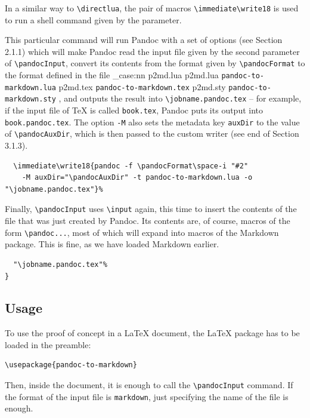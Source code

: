 \documentclass[
  digital,     %
  oneside,     %
  nosansbold,  %
  nocolorbold, %
  lof,         %
  nolot,       %
]{fithesis4}
\newcommand\macro[1]{\texttt{\textbackslash{}{#1}}}
\newcommand\file[1]
  {
    \str_case:nn
      { #1 }
      {
        { p2md.lua } { \texttt{pandoc\hyp{}to\hyp{}markdown.lua} }
        { p2md.tex } { \texttt{pandoc\hyp{}to\hyp{}markdown.tex} }
        { p2md.sty } { \texttt{pandoc\hyp{}to\hyp{}markdown.sty} }
      }
  }
\begin{document}
\noindent
In a similar way to \macro{directlua}, the pair of macros \macro{immediate}\macro{write18} is used to run a shell command given by the parameter.

This particular command will run Pandoc with a set of options (see Section 2.1.1) which will make Pandoc read the input file given by the second parameter of \macro{pandocInput}, convert its contents from the format given by \macro{pandocFormat} to the format defined in the file \file{p2md.lua}, and outputs the result into \macro{jobname.pandoc.tex} -- for example, if the input file of \TeX{} is called \texttt{book.tex}, Pandoc puts its output into \texttt{book.pandoc.tex}.
The option \texttt{-M} also sets the metadata key \texttt{auxDir} to the value of \macro{pandocAuxDir}, which is then passed to the custom writer (see end of Section 3.1.3).

\noindent
\lstset{language=[LaTeX]TeX}
\begin{lstlisting}
  \immediate\write18{pandoc -f \pandocFormat\space-i "#2"
    -M auxDir="\pandocAuxDir" -t pandoc-to-markdown.lua -o "\jobname.pandoc.tex"}%
\end{lstlisting}

\noindent
Finally, \macro{pandocInput} uses \macro{input} again, this time to insert the contents of the file that was just created by Pandoc. Its contents are, of course, macros of the form \macro{pandoc...}, most of which will expand into macros of the Markdown package. This is fine, as we have loaded Markdown earlier.

\noindent
\lstset{language=[LaTeX]TeX}
\begin{lstlisting}
  "\jobname.pandoc.tex"%
}
\end{lstlisting}

\subsection{Usage}
To use the proof of concept in a \LaTeX{} document, the \LaTeX{} package has to be loaded in the preamble:

\noindent
\lstset{language=[LaTeX]TeX}
\begin{lstlisting}
\usepackage{pandoc-to-markdown}
\end{lstlisting}

\noindent
Then, inside the document, it is enough to call the \macro{pandocInput} command. If the format of the input file is \texttt{markdown}, just specifying the name of the file is enough.
\end{document}
